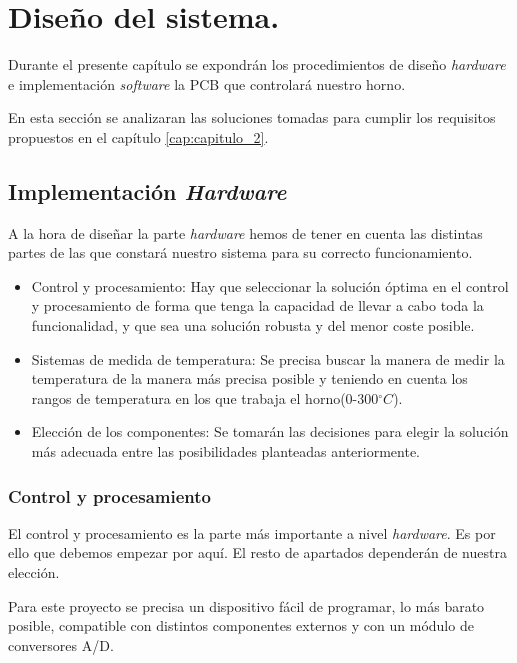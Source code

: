 \chapter{Diseño del sistema.}
\label{cap: capitulo_4}

Durante el presente capítulo se expondrán los procedimientos de diseño \textit{hardware} e implementación \textit{software} la PCB que controlará nuestro horno.

En esta sección se analizaran las soluciones tomadas para cumplir los requisitos propuestos en el capítulo \ref{cap:capitulo_2}.


\section{Implementación \textit{Hardware}}

A la hora de diseñar la parte \textit{hardware} hemos de tener en cuenta las distintas partes de las que constará nuestro sistema para su correcto funcionamiento.

\begin{itemize}
	\item  Control y procesamiento: Hay que seleccionar la solución óptima en el control y
procesamiento de forma que tenga la capacidad de llevar a cabo toda la funcionalidad,
y que sea una solución robusta y del menor coste posible.
	\item  Sistemas de medida de temperatura: Se precisa buscar la manera de medir la temperatura de la manera más precisa posible y teniendo en cuenta los rangos de temperatura en los que trabaja el horno(0-300$^{\circ}C$).
	\item  Elección de los componentes: Se tomarán las decisiones para elegir la solución más adecuada entre las posibilidades planteadas anteriormente.
	
\end{itemize}



\subsection{Control y procesamiento}
El control y procesamiento es la parte más importante a nivel \textit{hardware}. Es por ello que debemos empezar por aquí. El resto de apartados dependerán de nuestra elección.

Para este proyecto se precisa un dispositivo fácil de programar, lo más barato posible, compatible con distintos componentes externos y con un módulo de conversores A/D. 

